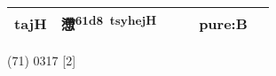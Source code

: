 \documentclass[14pt,a4paper]{scrartcl}
\begin{document}
\begin{longtable}[c]{@{}llllll@{}}
\begin{minipage}[t]{0.14\columnwidth}
tajH
\strut\end{minipage} &
\begin{minipage}[t]{0.14\columnwidth}\raggedright\strut
懘\textsuperscript{61d8~tsyhejH}
\strut\end{minipage} &
\begin{minipage}[t]{0.14\columnwidth}\raggedright\strut
\strut\end{minipage} &
\begin{minipage}[t]{0.14\columnwidth}\raggedright\strut
\strut\end{minipage} &
\begin{minipage}[t]{0.14\columnwidth}\raggedright\strut
pure:B
\strut\end{minipage}\tabularnewline
\bottomrule
\end{longtable}

(71) 0317 {[}2{]}
\end{document}
